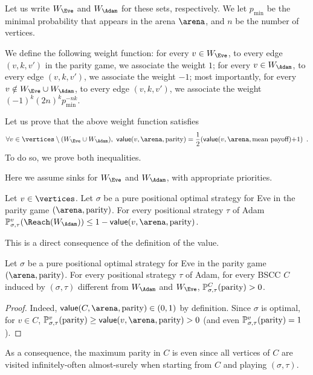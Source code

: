 Let us write $W_\Eve$ and $W_\Adam$ for these sets, respectively. We let
$p_{\min}$ be the minimal probability that appears in the arena
$\arena$, and $n$ be the number of vertices.

We define the following weight function: for every $v \in W_\Eve$,
to every edge $(v,k,v')$ in the parity game, we associate the weight
$1$; for every $v \in W_\Adam$, to every edge $(v,k,v')$, we associate
the weight $-1$; most importantly, for every
$v \notin W_\Eve \cup W_\Adam$, to every edge $(v,k,v')$, we associate the
weight $(-1)^k (2n)^k p_{\min}^{-nk}$.

Let us prove that the above weight function satisfies
\[
  \forall v \in \vertices \setminus (W_\Eve \cup W_\Adam),\ 
  \mathsf{value}(v,\arena,\textrm{parity}) = \frac 1 2
  (\mathsf{value}(v,\arena,\textrm{mean payoff}) {+} 1)\enspace.
\]
To do so, we prove both inequalities.

Here we assume sinks for $W_\Eve$ and $W_\Adam$, with appropriate priorities.

\begin{lemma} Let $v \in \vertices$. Let $\sigma$ be a pure
  positional optimal strategy for Eve in the parity game
  $(\arena,\textrm{parity})$. For every positional strategy $\tau$
  of Adam
  $\probm_{\sigma,\tau}^v(\Reach(W_\Adam)) \leq 1 -
  \mathsf{value}(v,\arena,\textrm{parity})$.
\end{lemma}
  This is a direct consequence of the definition of the value.

\begin{lemma}
    Let $\sigma$ be a pure positional optimal strategy for Eve in
    the parity game $(\arena,\textrm{parity})$. For every positional
    strategy $\tau$ of Adam, for every BSCC $C$ induced by
    $(\sigma,\tau)$ different from $W_\Adam$ and $W_\Eve$,
    $\mathbb{P}_{\sigma,\tau}^C(\textrm{parity}) >0$.
\end{lemma}
\begin{proof}
    Indeed, $\mathsf{value}(C,\arena,\textrm{parity}) \in (0,1)$ by
    definition. Since $\sigma$ is optimal, for $v \in C$,
    $\probm_{\sigma,\tau}^v(\textrm{parity}) \geq
    \mathsf{value}(v,\arena,\textrm{parity}) >0$ (and even
    $\mathbb{P}_{\sigma,\tau}^v(\textrm{parity})=1$).
\end{proof}
  As a consequence, the maximum parity in $C$ is even since all
  vertices of $C$ are visited infinitely-often almost-surely when
  starting from $C$ and playing $(\sigma,\tau)$.

